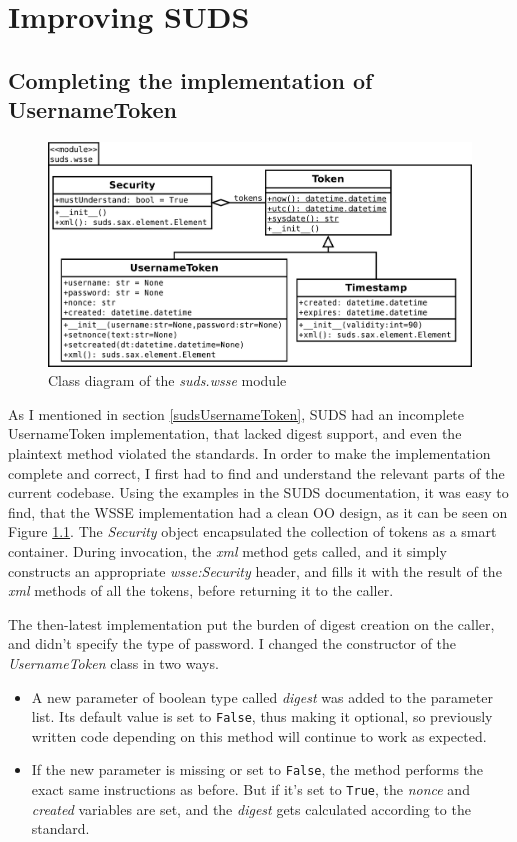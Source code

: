 \chapter{Improving SUDS}

\section{Completing the implementation of UsernameToken}

\begin{figure}[htbp]
 \centering
 \includegraphics[width=12cm]{images/clsdSudsWsse.pdf}
 \caption{Class diagram of the \emph{suds.wsse} module}
 \label{fig:clsdSudsWsse}
\end{figure}

As I mentioned in section \ref{sudsUsernameToken}, SUDS had an incomplete UsernameToken implementation, that lacked digest support, and even the plaintext method violated the standards. In order to make the implementation complete and correct, I first had to find and understand the relevant parts of the current codebase. Using the examples in the SUDS documentation, it was easy to find, that the WSSE implementation had a clean OO design, as it can be seen on Figure \ref{fig:clsdSudsWsse}. The \emph{Security} object encapsulated the collection of tokens as a smart container. During invocation, the \emph{xml} method gets called, and it simply constructs an appropriate \emph{wsse:Security} header, and fills it with the result of the \emph{xml} methods of all the tokens, before returning it to the caller.

The then-latest implementation put the burden of digest creation on the caller, and didn't specify the type of password. I changed the constructor of the \emph{UsernameToken} class in two ways.

\begin{itemize}
 \item A new parameter of boolean type called \emph{digest} was added to the parameter list. Its default value is set to \verb|False|, thus making it optional, so previously written code depending on this method will continue to work as expected.
 \item If the new parameter is missing or set to \verb|False|, the method performs the exact same instructions as before. But if it's set to \verb|True|, the \emph{nonce} and \emph{created} variables are set, and the \emph{digest} gets calculated according to the standard.
\end{itemize}

